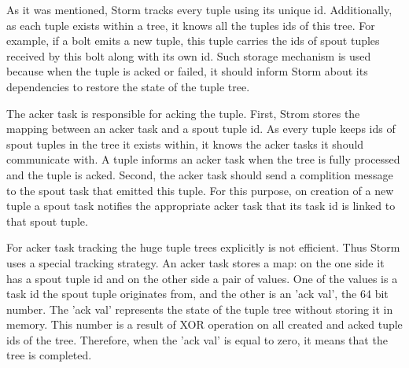 As it was mentioned, Storm tracks every tuple using its unique id.
Additionally, as each tuple exists within a tree, it knows all the tuples ids of this tree.
For example, if a bolt emits a new tuple, this tuple carries the ids of spout tuples received by this bolt along with its own id.
Such storage mechanism is used	because when the tuple is acked or failed, it should inform Storm about its dependencies to restore the state of the tuple tree.  

The acker task is responsible for acking the tuple.
First, Strom stores the mapping between an acker task and a spout tuple id.
As every tuple keeps ids of spout tuples in the tree it exists within, it knows the acker tasks it should communicate with.
A tuple informs an acker task when the tree is fully processed and the tuple is acked.
Second, the acker task should send a complition message to the spout task that emitted this tuple.
For this purpose, on creation of a new tuple a spout task notifies the appropriate acker task that its task id is linked to that spout tuple.

For acker task tracking the huge tuple trees explicitly is not efficient.
Thus Storm uses a special tracking strategy.
An acker task stores a map: on the one side it has a spout tuple id and on the other side a pair of values.
One of the values is a task id the spout tuple originates from, and the other is an 'ack val', the 64 bit number.
The 'ack val' represents the state of the tuple tree without storing it in memory.
This number is a result of XOR operation on all created and acked tuple ids of the tree.
Therefore, when the 'ack val' is equal to zero, it means that the tree is completed.  